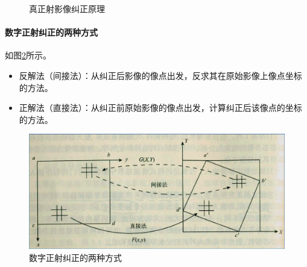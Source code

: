 \begin{figure}[htbp]
	\centering
	\caption{真正射影像纠正原理}
	\label{fig:真正射影像纠正原理}
\end{figure}

\paragraph{数字正射纠正的两种方式}如图\ref{fig:数字正射纠正的两种方式}所示。
\begin{itemize}
	\item 反解法（间接法）：从纠正后影像的像点出发，反求其在原始影像上像点坐标的方法。
	\item 正解法（直接法）：从纠正前原始影像的像点出发，计算纠正后该像点的坐标的方法。
\end{itemize}

\begin{figure}[htbp]
	\centering
	\includegraphics[width=0.7\linewidth]{figure/Chapter6/数字正射纠正的两种方式}
	\caption{数字正射纠正的两种方式}
	\label{fig:数字正射纠正的两种方式}
\end{figure}

